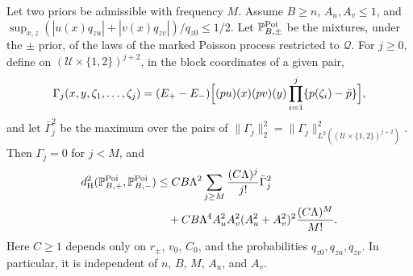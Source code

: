 \begin{lemma}
\label{lem:poisson-comparison}
Let two priors be admissible with frequency $M$. Assume $B\ge n$,
$A_u,A_v\le1$, and
$\sup_{x,z}(|u(x)q_{zu}|+|v(x)q_{zv}|)/q_{z0}\le1/2$.
Let $\mathbb P^{\rm Poi}_{B,\pm}$ be the mixtures, under the $\pm$
prior, of the laws of the marked Poisson process restricted to
$\mathcal Q$. For $j\ge0$, define on $(\mathcal U\times\{1,2\})^{j+2}$,
in the block coordinates of a given pair,
\[
 \Gamma_j(x,y,\zeta_1,\ldots,\zeta_j)=(E_+-E_-)
 \Bigl[(pu)(x)(pv)(y)\prod_{i=1}^j\{p(\zeta_i)-\bar p\}\Bigr],
\]
and let $\bar\Gamma_j^2$ be the maximum over the pairs of
$\|\Gamma_j\|_2^2=\|\Gamma_j\|_{L^2((\mathcal U\times\{1,2\})^{j+2})}^2$.
Then $\Gamma_j=0$ for $j<M$, and
\begin{equation}\label{eq:poisson-comparison-bound}
\begin{split}
 d_{\rm H}^2(\mathbb P^{\rm Poi}_{B,+},\mathbb P^{\rm Poi}_{B,-})
 &\le CB\Lambda^2\sum_{j\ge M}\frac{(C\Lambda)^j}{j!}\bar\Gamma_j^2\\
 &\quad+CB\Lambda^4A_u^2A_v^2(A_u^2+A_v^2)^2\frac{(C\Lambda)^M}{M!}.
\end{split}
\end{equation}
Here $C\ge1$ depends only on $r_\pm$, $v_0$, $C_0$, and the
probabilities $q_{z0},q_{zu},q_{zv}$. In particular, it is independent
of $n$, $B$, $M$, $A_u$, and $A_v$.
\end{lemma}

